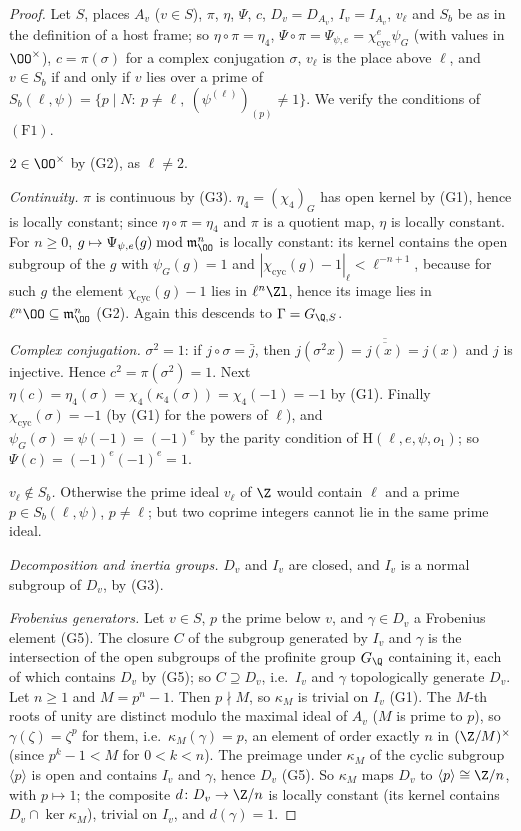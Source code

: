 \begin{proof}
Let $S$, places $A_v$ ($v\in S$), $\pi$, $\eta$, $\Psi$, $c$, $D_v=D_{A_v}$, $I_v=I_{A_v}$, $v_\ell$ and $S_b$ be as in the definition of a host frame; so
$\eta\circ\pi=\eta_4$, $\Psi\circ\pi=\Psi_{\psi,e}=\chi_{\mathrm{cyc}}^e\psi_G$ (with values in $\OO^\times$), $c=\pi(\sigma)$ for a complex
conjugation $\sigma$, $v_\ell$ is the place above $\ell$, and $v\in S_b$ if and only if $v$ lies over a prime of
$S_b(\ell,\psi)=\{p\mid N:\ p\ne\ell,\ (\psi^{(\ell)})_{(p)}\ne1\}$. We verify the conditions of $(\mathrm{F1})$.

\emph{$2\in\OO^\times$} by (G2), as $\ell\ne2$.

\emph{Continuity.} $\pi$ is continuous by (G3). $\eta_4=(\chi_4)_G$ has open kernel by (G1), hence is locally constant; since $\eta\circ\pi=\eta_4$
and $\pi$ is a quotient map, $\eta$ is locally constant. For $n\ge0$, $g\mapsto\Psi_{\psi,e}(g)\bmod\mathfrak m_\OO^n$ is locally constant: its
kernel contains the open subgroup of the $g$ with $\psi_G(g)=1$ and $|\chi_{\mathrm{cyc}}(g)-1|_\ell<\ell^{-n+1}$, because for such $g$ the
element $\chi_{\mathrm{cyc}}(g)-1$ lies in $\ell^n\Zl$, hence its image lies in $\ell^n\OO\subseteq\mathfrak m_\OO^n$ (G2). Again this descends
to $\Gamma=G_{\Q,S}$.

\emph{Complex conjugation.} $\sigma^2=1$: if $j\circ\sigma=\bar j$, then $j(\sigma^2x)=\overline{\overline{j(x)}}=j(x)$ and $j$ is injective.
Hence $c^2=\pi(\sigma^2)=1$. Next $\eta(c)=\eta_4(\sigma)=\chi_4(\kappa_4(\sigma))=\chi_4(-1)=-1$ by (G1). Finally
$\chi_{\mathrm{cyc}}(\sigma)=-1$ (by (G1) for the powers of $\ell$), and $\psi_G(\sigma)=\psi(-1)=(-1)^e$ by the parity condition of
$\mathrm{H}(\ell,e,\psi,o_1)$; so $\Psi(c)=(-1)^e(-1)^e=1$.

\emph{$v_\ell\notin S_b$.} Otherwise the prime ideal $v_\ell$ of $\Z$ would contain $\ell$ and a prime $p\in S_b(\ell,\psi)$, $p\ne\ell$; but two
coprime integers cannot lie in the same prime ideal.

\emph{Decomposition and inertia groups.} $D_v$ and $I_v$ are closed, and $I_v$ is a normal subgroup of $D_v$, by (G3).

\emph{Frobenius generators.} Let $v\in S$, $p$ the prime below $v$, and $\gamma\in D_v$ a Frobenius element (G5). The closure $C$ of the subgroup
generated by $I_v$ and $\gamma$ is the intersection of the open subgroups of the profinite group $G_\Q$ containing it, each of which contains
$D_v$ by (G5); so $C\supseteq D_v$, i.e.\ $I_v$ and $\gamma$ topologically generate $D_v$. Let $n\ge1$ and $M=p^n-1$. Then $p\nmid M$, so
$\kappa_M$ is trivial on $I_v$ (G1). The $M$-th roots of unity are distinct modulo the maximal ideal of $A_v$ ($M$ is prime to $p$), so
$\gamma(\zeta)=\zeta^p$ for them, i.e.\ $\kappa_M(\gamma)=p$, an element of order exactly $n$ in $(\Z/M)^\times$ (since $p^k-1<M$ for
$0<k<n$). The preimage under $\kappa_M$ of the cyclic subgroup $\langle p\rangle$ is open and contains $I_v$ and $\gamma$, hence $D_v$
(G5). So $\kappa_M$ maps $D_v$ to $\langle p\rangle\cong\Z/n$, with $p\mapsto1$; the composite $d\colon D_v\to\Z/n$ is locally constant (its
kernel contains $D_v\cap\ker\kappa_M$), trivial on $I_v$, and $d(\gamma)=1$.


\end{proof}
